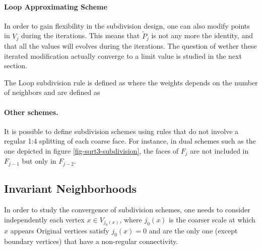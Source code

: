 \paragraph{Loop Approximating Scheme}

In order to gain flexibility in the subdivision design, one can also modify points in $V_j$ during the iterations. This means that $\tilde P_j$ is not any more the identity, and that all the values will evolves during the iterations. The question of wether these iterated modification actually converge to a limit value is studied in the next section.

The Loop subdivision rule is defined as
where the weights depends on the number of neighbors and are defined as

\paragraph{Other schemes.}

It is possible to define subdivision schemes using rules that do not involve a regular 1:4 splitting of each coarse face. For instance, in dual schemes such as the one depicted in figure \ref{fig-sqrt3-subdivision}, the faces of $F_{j}$ are not included in $F_{j-1}$ but only in $F_{j-2}$. 


\subsection{Invariant Neighborhoods}

In order to study the convergence of subdivision schemes, one needs to consider independently each vertex $x \in V_{j_0(x)}$, where $j_0(x)$ is the coarser scale at which $x$ appears 
Original vertices satisfy $j_0(x)=0$ and are the only one (except boundary vertices) that have a non-regular connectivity.

